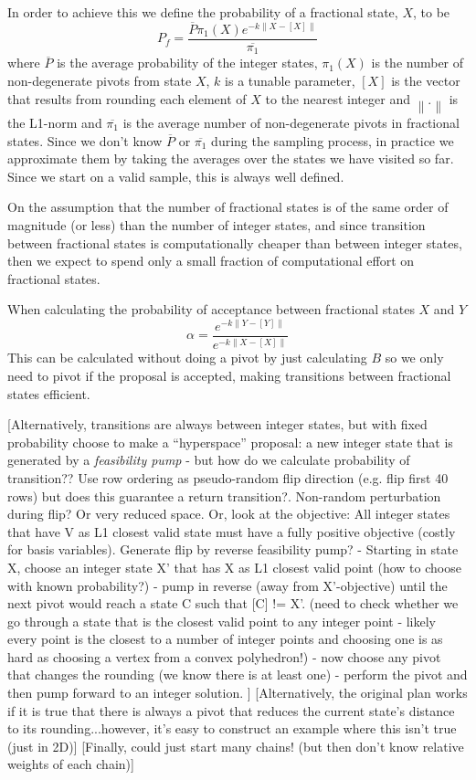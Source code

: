 In order to achieve this we define the probability of a fractional state, $X$, to be
\begin{equation}
P_f = \frac{\overline{P}\pi_1(X)e^{-k\left\|X - \left[X\right]\right\|}}{\overline{\pi_1}}
\end{equation}
where $\overline{P}$ is the average probability of the integer states, $\pi_1(X)$ is the number of non-degenerate pivots from state $X$, $k$ is a tunable parameter, $\left[X\right]$ is the vector that results from rounding each element of $X$ to the nearest integer and $\left\| . \right\|$ is the L1-norm and $\overline{\pi_1}$ is the average number of non-degenerate pivots in fractional states. Since we don't know $\overline{P}$ or $\overline{\pi_1}$ during the sampling process, in practice we approximate them by taking the averages over the states we have visited so far. Since we start on a valid sample, this is always well defined.

On the assumption that the number of fractional states is of the same order of magnitude (or less) than the number of integer states, and since transition between fractional states is computationally cheaper than between integer states, then we expect to spend only a small fraction of computational effort on fractional states.

When calculating the probability of acceptance between fractional states $X$ and $Y$
\[
\alpha = \frac{e^{-k\left\|Y - \left[Y\right]\right\|}}{e^{-k\left\|X - \left[X\right]\right\|}}
\]
This can be calculated without doing a pivot by just calculating $B$ so we only need to pivot if the proposal is accepted, making transitions between fractional states efficient.

[Alternatively, transitions are always between integer states, but with fixed probability choose to make a ``hyperspace'' proposal: a new integer state that is generated by a \textit{feasibility pump}\cite{fischetti2005feasibility} - but how do we calculate probability of transition?? 
Use row ordering as pseudo-random flip direction (e.g. flip first 40 rows) but does this guarantee a return transition?.
Non-random perturbation during flip? Or very reduced space. 
Or, look at the objective: All integer states that have V as L1 closest valid state must have a fully positive objective (costly for basis variables).
Generate flip by reverse feasibility pump?
 - Starting in state X, choose an integer state X' that has X as L1 closest valid point (how to choose with known probability?)
 - pump in reverse (away from X'-objective) until the next pivot would reach a state C such that [C] != X'. (need to check whether we go through a state that is the closest valid point to any integer point - likely every point is the closest to a number of integer points and choosing one is as hard as choosing a vertex from a convex polyhedron!)
- now choose any pivot that changes the rounding (we know there is at least one)
- perform the pivot and then pump forward to an integer solution.
]
[Alternatively, the original plan works if it is true that there is always a pivot that reduces the current state's distance to its rounding...however, it's easy to construct an example where this isn't true (just in 2D)]
[Finally, could just start many chains! (but then don't know relative weights of each chain)]

